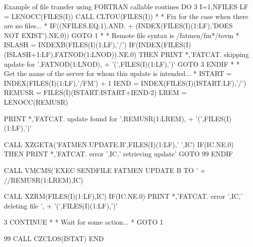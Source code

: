 \begin{XMPt}{Example of file transfer using FORTRAN callable routines}
      DO 3 I=1,NFILES
      LF = LENOCC(FILES(I))
      CALL CLTOU(FILES(I))
*
*     Fix for the case when there are no files...
*
      IF((NFILES.EQ.1).AND.
     +   (INDEX(FILES(I)(1:LF),'DOES NOT EXIST').NE.0)) GOTO 1
*
*     Remote file syntax is /fatmen/fm*/tovm
*
      ISLASH = INDEXB(FILES(I)(1:LF),'/')
      IF(INDEX(FILES(I)(ISLASH+1:LF),FATNOD(1:LNOD)).NE.0) THEN
         PRINT *,'FATCAT. skipping update for ',FATNOD(1:LNOD),
     +           '(',FILES(I)(1:LF),')'
         GOTO 3
      ENDIF
*
*     Get the name of the server for whom this update is intended...
*
      ISTART = INDEX(FILES(I)(1:LF),'/FM') + 1
      IEND   = INDEX(FILES(I)(ISTART:LF),'/')
      REMUSR = FILES(I)(ISTART:ISTART+IEND-2)
      LREM   = LENOCC(REMUSR)

      PRINT *,'FATCAT. update found for ',REMUSR(1:LREM),
     +           '(',FILES(I)(1:LF),')'

      CALL XZGETA('FATMEN.UPDATE.B',FILES(I)(1:LF),' ',IC)
      IF(IC.NE.0) THEN
         PRINT *,'FATCAT. error ',IC,' retrieving update'
         GOTO 99
      ENDIF

      CALL VMCMS('EXEC SENDFILE FATMEN UPDATE B TO '
     +           //REMUSR(1:LREM),IC)

      CALL XZRM(FILES(I)(1:LF),IC)
      IF(IC.NE.0) PRINT *,'FATCAT. error ',IC,' deleting file ',
     +           '(',FILES(I)(1:LF),')'

3     CONTINUE
*
*     Wait for some action...
*
      GOTO 1

   99 CALL CZCLOS(ISTAT)
      END
\end{XMPt}
